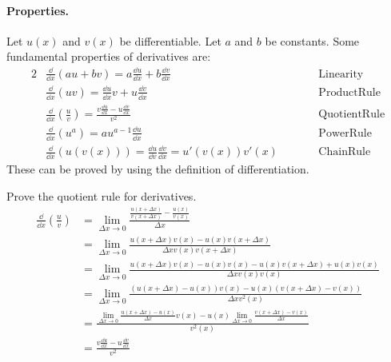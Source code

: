 \paragraph{Properties.}
Let $u(x)$ and $v(x)$ be differentiable.  Let $a$ and $b$ be constants.
Some fundamental properties of derivatives are:
\begin{alignat*}{2}
  &\frac{\dd}{\dd x}(a u+b v) = a \frac{\dd u}{\dd x} + b \frac{\dd v}{\dd x} 
  &\qquad &\mathrm{Linearity} 
  \\
  &\frac{\dd}{\dd x}(u v) = \frac{\dd u}{\dd x} v + u \frac{\dd v}{\dd x} 
  &\qquad &\mathrm{Product Rule} 
  \\
  &\frac{\dd}{\dd x}\left( \frac{u}{v} \right)
  = \frac{v \frac{\dd u}{\dd x} - u \frac{\dd v}{\dd x}}{v^2} 
  &\qquad &\mathrm{Quotient Rule} 
  \\
  &\frac{\dd}{\dd x}(u^a) = a u^{a-1} \frac{\dd u}{\dd x} 
  &\qquad &\mathrm{Power Rule} 
  \\
  &\frac{\dd}{\dd x} (u(v(x))) = \frac{\dd u}{\dd v} \frac{\dd v}{\dd x} 
  = u'(v(x)) v'(x)
  &\qquad &\mathrm{Chain Rule}
\end{alignat*}
These can be proved by using the definition of differentiation.


\begin{Example}
  Prove the quotient rule for derivatives.
  \begin{align*}
    \frac{\dd}{\dd x} \left( \frac{u}{v} \right)
    &= \lim_{\Delta x \to 0} \frac{\frac{u(x+\Delta x)}{v(x+\Delta x)} - \frac{u(x)}{v(x)} }{\Delta x}
    \\
    &= \lim_{\Delta x \to 0} \frac{ u(x+\Delta x) v(x) - u(x) v(x+\Delta x) }
    { \Delta x v(x) v(x + \Delta x) }
    \\
    &= \lim_{\Delta x \to 0} \frac{ u(x+\Delta x) v(x) -u(x) v(x)
      - u(x) v(x+\Delta x) + u(x) v(x) }{ \Delta x v(x) v(x) }
    \\
    &= \lim_{\Delta x \to 0} \frac{ (u(x+\Delta x) -u(x)) v(x)
      - u(x) ( v(x+\Delta x) - v(x) ) }{ \Delta x v^2(x) }
    \\
    &= \frac{ \lim_{\Delta x \to 0} \frac{u(x+\Delta x) -u(x)}{\Delta x} 
      v(x) - u(x) \lim_{\Delta x \to 0} \frac{v(x+\Delta x) - v(x)} {\Delta x}  }{ v^2(x) }
    \\
    &= \frac{v \frac{\dd u}{\dd x} - u \frac{\dd v}{\dd x}}{v^2} 
  \end{align*}
\end{Example}




